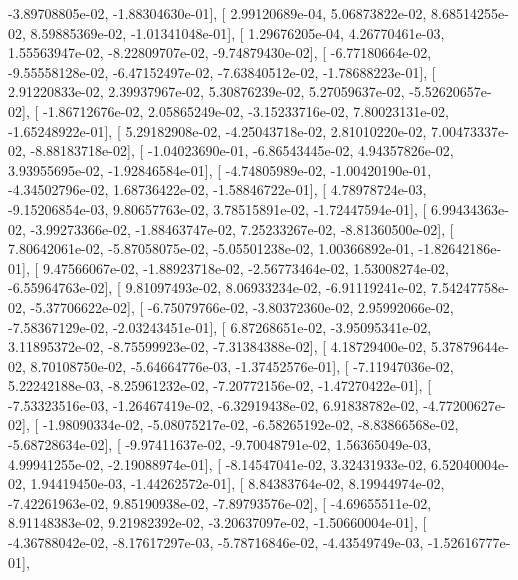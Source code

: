 \documentclass{article}
\begin{document}
         -3.89708805e-02,  -1.88304630e-01],
       [  2.99120689e-04,   5.06873822e-02,   8.68514255e-02,
          8.59885369e-02,  -1.01341048e-01],
       [  1.29676205e-04,   4.26770461e-03,   1.55563947e-02,
         -8.22809707e-02,  -9.74879430e-02],
       [ -6.77180664e-02,  -9.55558128e-02,  -6.47152497e-02,
         -7.63840512e-02,  -1.78688223e-01],
       [  2.91220833e-02,   2.39937967e-02,   5.30876239e-02,
          5.27059637e-02,  -5.52620657e-02],
       [ -1.86712676e-02,   2.05865249e-02,  -3.15233716e-02,
          7.80023131e-02,  -1.65248922e-01],
       [  5.29182908e-02,  -4.25043718e-02,   2.81010220e-02,
          7.00473337e-02,  -8.88183718e-02],
       [ -1.04023690e-01,  -6.86543445e-02,   4.94357826e-02,
          3.93955695e-02,  -1.92846584e-01],
       [ -4.74805989e-02,  -1.00420190e-01,  -4.34502796e-02,
          1.68736422e-02,  -1.58846722e-01],
       [  4.78978724e-03,  -9.15206854e-03,   9.80657763e-02,
          3.78515891e-02,  -1.72447594e-01],
       [  6.99434363e-02,  -3.99273366e-02,  -1.88463747e-02,
          7.25233267e-02,  -8.81360500e-02],
       [  7.80642061e-02,  -5.87058075e-02,  -5.05501238e-02,
          1.00366892e-01,  -1.82642186e-01],
       [  9.47566067e-02,  -1.88923718e-02,  -2.56773464e-02,
          1.53008274e-02,  -6.55964763e-02],
       [  9.81097493e-02,   8.06933234e-02,  -6.91119241e-02,
          7.54247758e-02,  -5.37706622e-02],
       [ -6.75079766e-02,  -3.80372360e-02,   2.95992066e-02,
         -7.58367129e-02,  -2.03243451e-01],
       [  6.87268651e-02,  -3.95095341e-02,   3.11895372e-02,
         -8.75599923e-02,  -7.31384388e-02],
       [  4.18729400e-02,   5.37879644e-02,   8.70108750e-02,
         -5.64664776e-03,  -1.37452576e-01],
       [ -7.11947036e-02,   5.22242188e-03,  -8.25961232e-02,
         -7.20772156e-02,  -1.47270422e-01],
       [ -7.53323516e-03,  -1.26467419e-02,  -6.32919438e-02,
          6.91838782e-02,  -4.77200627e-02],
       [ -1.98090334e-02,  -5.08075217e-02,  -6.58265192e-02,
         -8.83866568e-02,  -5.68728634e-02],
       [ -9.97411637e-02,  -9.70048791e-02,   1.56365049e-03,
          4.99941255e-02,  -2.19088974e-01],
       [ -8.14547041e-02,   3.32431933e-02,   6.52040004e-02,
          1.94419450e-03,  -1.44262572e-01],
       [  8.84383764e-02,   8.19944974e-02,  -7.42261963e-02,
          9.85190938e-02,  -7.89793576e-02],
       [ -4.69655511e-02,   8.91148383e-02,   9.21982392e-02,
         -3.20637097e-02,  -1.50660004e-01],
       [ -4.36788042e-02,  -8.17617297e-03,  -5.78716846e-02,
         -4.43549749e-03,  -1.52616777e-01],
\end{document}
